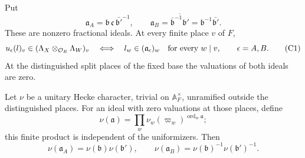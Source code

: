 \begin{srlemma}
\label{lem:sr-cone-coefficient-ideals}
Put
\[
 \mathfrak a_A=\mathfrak b\,\mathfrak c\,
                     \bar{\mathfrak b'}^{-1},
 \qquad
 \mathfrak a_B=
       \overline{\bar{\mathfrak b}^{-1}\mathfrak b'}
       =\mathfrak b^{-1}\bar{\mathfrak b'}.
\]
These are nonzero fractional ideals. At every finite place \(v\) of \(F\),
\[
 u_\epsilon(l)_v\in(\Lambda_X\otimes_{\mathcal O_E}\Lambda_W)_v
 \quad\Longleftrightarrow\quad
 l_w\in(\mathfrak a_\epsilon)_w
       \quad\hbox{for every \(w\mid v\)},\qquad \epsilon=A,B.
 \tag{C1}\label{eq:sr-cone-coefficient-support}
\]
At the distinguished split places of the fixed base the valuations of
both ideals are zero.

Let \(\nu\) be a unitary Hecke character, trivial on
\(\mathbb A_F^\times\), unramified outside the distinguished places.
For an ideal with zero valuations at those places, define
\[
 \nu(\mathfrak a)=
 \prod_w\nu_w(\varpi_w)^{\operatorname{ord}_w\mathfrak a};
\]
this finite product is independent of the uniformizers. Then
\[
 \nu(\mathfrak a_A)=\nu(\mathfrak b)\nu(\mathfrak b'),
 \qquad
 \nu(\mathfrak a_B)=
             \nu(\mathfrak b)^{-1}\nu(\mathfrak b')^{-1}.
 \tag{C2}\label{eq:sr-cone-ideal-characters}
\]
\end{srlemma}

